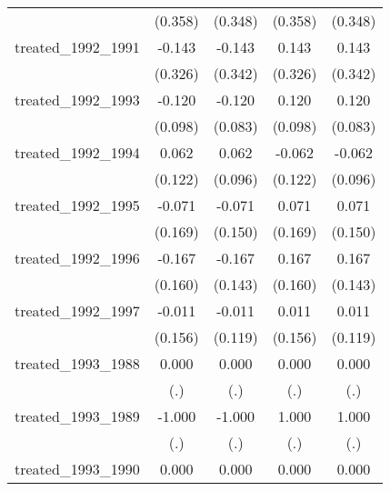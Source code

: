 {\begin{tabular}{l*{4}{c}}
            &     (0.358)         &     (0.348)         &     (0.358)         &     (0.348)         \\
[1em]
treated\_1992\_1991&      -0.143         &      -0.143         &       0.143         &       0.143         \\
            &     (0.326)         &     (0.342)         &     (0.326)         &     (0.342)         \\
[1em]
treated\_1992\_1993&      -0.120         &      -0.120         &       0.120         &       0.120         \\
            &     (0.098)         &     (0.083)         &     (0.098)         &     (0.083)         \\
[1em]
treated\_1992\_1994&       0.062         &       0.062         &      -0.062         &      -0.062         \\
            &     (0.122)         &     (0.096)         &     (0.122)         &     (0.096)         \\
[1em]
treated\_1992\_1995&      -0.071         &      -0.071         &       0.071         &       0.071         \\
            &     (0.169)         &     (0.150)         &     (0.169)         &     (0.150)         \\
[1em]
treated\_1992\_1996&      -0.167         &      -0.167         &       0.167         &       0.167         \\
            &     (0.160)         &     (0.143)         &     (0.160)         &     (0.143)         \\
[1em]
treated\_1992\_1997&      -0.011         &      -0.011         &       0.011         &       0.011         \\
            &     (0.156)         &     (0.119)         &     (0.156)         &     (0.119)         \\
[1em]
treated\_1993\_1988&       0.000         &       0.000         &       0.000         &       0.000         \\
            &         (.)         &         (.)         &         (.)         &         (.)         \\
[1em]
treated\_1993\_1989&      -1.000         &      -1.000         &       1.000         &       1.000         \\
            &         (.)         &         (.)         &         (.)         &         (.)         \\
[1em]
treated\_1993\_1990&       0.000         &       0.000         &       0.000         &       0.000         \\

\end{tabular}}
